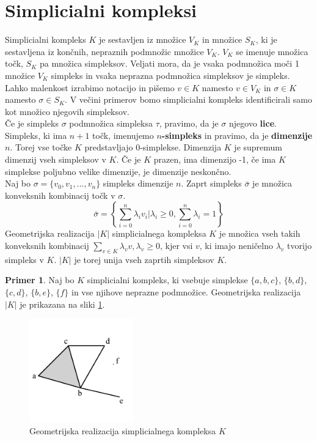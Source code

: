 \documentclass[a4paper, 12pt]{book}
\theoremstyle{definition}
\newtheorem{example}{Primer}[section]
\begin{document}
\section{Simplicialni kompleksi}
Simplicialni kompleks $K$ je sestavljen iz množice $V_K$ in množice $S_K$, ki je
sestavljena iz končnih, nepraznih podmnožic množice $V_K$.
$V_K$ se imenuje množica točk, $S_K$ pa množica simpleksov. Veljati mora, da
je vsaka podmnožica moči 1 množice $V_K$ simpleks in vsaka neprazna podmnožica
simpleksov je simpleks. Lahko malenkost izrabimo notacijo in pišemo $v \in K$ namesto
$v \in V_K$ in $\sigma \in K$ namesto $\sigma \in S_K$. V večini primerov bomo
simplicialni kompleks identificirali samo kot množico njegovih simpleksov.\\
Če je simpleks $\sigma$ podmnožica simpleksa $\tau$, pravimo, da je $\sigma$ njegovo \textbf{lice}.
Simpleks, ki ima $n+1$ točk, imenujemo \textbf{$n$-simpleks} in pravimo, da je \textbf{dimenzije} $n$.
Torej vse točke $K$ predstavljajo 0-simplekse. Dimenzija $K$ je supremum dimenzij
vseh simpleksov v $K$. Če je $K$ prazen, ima dimenzijo -1, če ima $K$ simplekse
poljubno velike dimenzije, je dimenzije neskončno.\\
Naj bo $\sigma = \{v_0,v_1,\dots,v_n\}$ simpleks dimenzije $n$. Zaprt simpleks
$\bar{\sigma}$ je množica konveksnih kombinacij točk v $\sigma$.
\[
  \bar{\sigma} = \left\{\sum_{i=0}^n \lambda_i v_i | \lambda_i \geq 0, \sum_{i=0}^n \lambda_i = 1\right\}
\]
Geometrijska realizacija $|K|$ simplicialnega kompleksa $K$ je množica 
vseh takih konveksnih kombinacij $\sum_{v\in K} \lambda_v v, \lambda_v \geq 0$, kjer vsi $v$, ki imajo
neničelno $\lambda_v$ tvorijo simpleks v $K$. $|K|$ je torej unija vseh zaprtih
simpleksov $K$.
\begin{example}
  Naj bo $K$ simplicialni kompleks, ki vsebuje simplekse
  $\{a,b,c\}$, $\{b,d\}$, $\{c,d\}$, $\{b,e\}$, $\{f\}$ in vse njihove neprazne
  podmnožice.
  Geometrijska realizacija $|K|$ je prikazana na sliki \ref{sx}.
  \begin{figure}[h]
      \begin{center}
      \includegraphics[width=0.4\textwidth]{simplicialni-kompleks.pdf}
      \end{center}
      \caption{Geometrijska realizacija simplicialnega kompleksa $K$}
      \label{sx}
  \end{figure}
\end{example}
\end{document}
